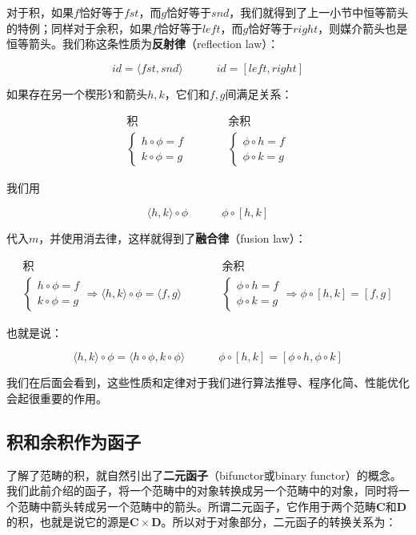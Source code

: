 \documentclass{article}
\begin{document}
对于积，如果$f$恰好等于$fst$，而$g$恰好等于$snd$，我们就得到了上一小节中恒等箭头的特例；同样对于余积，如果$f$恰好等于$left$，而$g$恰好等于$right$，则媒介箭头也是恒等箭头。我们称这条性质为\textbf{反射律}（reflection law）：

\[
id = \langle fst, snd \rangle \quad \quad \quad id = [left, right]
\]

如果存在另一个楔形$Y$和箭头$h, k$，它们和$f, g$间满足关系：

\[
\begin{array}{ccc}
  \text{积} & & \text{余积} \\
  \begin{cases}
  h \circ \phi = f \\
  k \circ \phi = g
  \end{cases}
  & \quad \quad &
  \begin{cases}
  \phi \circ h = f \\
  \phi \circ k = g
  \end{cases}
\end{array}
\]

我们用

\[
\langle h, k \rangle \circ \phi \quad \quad \quad \phi \circ [h, k]
\]

代入$m$，并使用消去律，这样就得到了\textbf{融合律}（fusion law）：

\[
\begin{array}{ccc}
  \text{积} & & \text{余积} \\
  \begin{cases}
  h \circ \phi = f \\
  k \circ \phi = g
  \end{cases} \Rightarrow
    \langle h, k \rangle \circ \phi = \langle f, g \rangle
  & \quad \quad &
  \begin{cases}
  \phi \circ h = f \\
  \phi \circ k = g
  \end{cases} \Rightarrow
    \phi \circ [h, k] = [f, g]
\end{array}
\]

也就是说：

\[
\langle h, k \rangle \circ \phi = \langle h \circ \phi, k \circ \phi \rangle
\quad \quad \quad
\phi \circ [h, k] = [\phi \circ h, \phi \circ k]
\]

我们在后面会看到，这些性质和定律对于我们进行算法推导、程序化简、性能优化会起很重要的作用。

\subsection{积和余积作为函子}
了解了范畴的积，就自然引出了\textbf{二元函子}（bifunctor或binary functor）的概念。我们此前介绍的函子，将一个范畴中的对象转换成另一个范畴中的对象，同时将一个范畴中箭头转成另一个范畴中的箭头。所谓二元函子，它作用于两个范畴$\pmb{C}$和$\pmb{D}$的积，也就是说它的源是$\pmb{C} \times \pmb{D}$。所以对于对象部分，二元函子的转换关系为：
\end{document}
